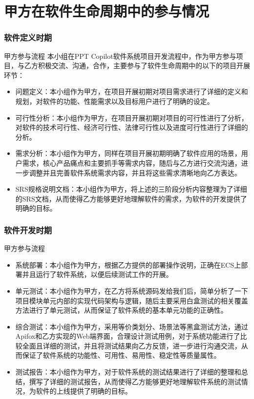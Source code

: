 \section{甲方在软件生命周期中的参与情况}
\begin{frame}
    \frametitle{软件定义时期}
    \footnotesize
    \begin{block}{甲方参与流程}
        本小组在PPT Copilot软件系统项目开发流程中，作为甲方参与项目，与乙方积极交流、沟通，合作，主要参与了软件生命周期中的以下的项目开展环节：
        \begin{itemize}
            \item 问题定义：本小组作为甲方，在项目开展初期对项目需求进行了详细的定义和规划，对软件的功能、性能需求以及目标用户进行了明确的设定。
            \item 可行性分析：本小组作为甲方，在项目开展初期对项目的可行性进行了分析，对软件的技术可行性、经济可行性、法律可行性以及进度可行性进行了详细的分析。
            \item 需求分析：本小组作为甲方，同样在项目开展初期明确了软件应用的场景，用户需求，核心产品痛点和主要抓手等需求内容，随后与乙方进行交流沟通，进一步调整并且完善软件系统需求内容，并且将这些需求清晰地向乙方表达。
            \item SRS规格说明文档：本小组作为甲方，将上述的三阶段分析内容整理为了详细的SRS文档，从而使得乙方能够更好地理解软件的需求，为软件的开发提供了明确的目标。
        \end{itemize}
    \end{block}
\end{frame}

\begin{frame}
    \frametitle{软件开发时期}
    \footnotesize
    \begin{block}{甲方参与流程}
        \begin{itemize}
            \item 系统部署：本小组作为甲方，根据乙方提供的部署操作说明，正确在ECS上部署并且运行了软件系统，以便后续测试工作的开展。
            \item 单元测试：本小组作为甲方，在乙方将系统源码发给我们后，简单分析了一下项目模块单元内部的实现代码架构与逻辑，随后主要采用白盒测试的相关覆盖方法进行了单元测试，从而保证了软件系统的基本单元功能的正确性。
            \item 综合测试：本小组作为甲方，采用等价类划分、场景法等黑盒测试方法，通过Apifox和乙方实现的Web端界面，合理设计测试用例，对于系统功能进行了比较全面且详细的测试，并且将测试结果向乙方反馈，进一步进行沟通交流，从而保证了软件系统的功能性、可用性、易用性、稳定性等质量属性。
            \item 测试报告：本小组作为甲方，对于软件系统的测试结果进行了详细的整理和总结，撰写了详细的测试报告，从而使得乙方能够更好地理解软件系统的测试情况，为软件的上线提供了明确的目标。
        \end{itemize}
    \end{block}
\end{frame}

